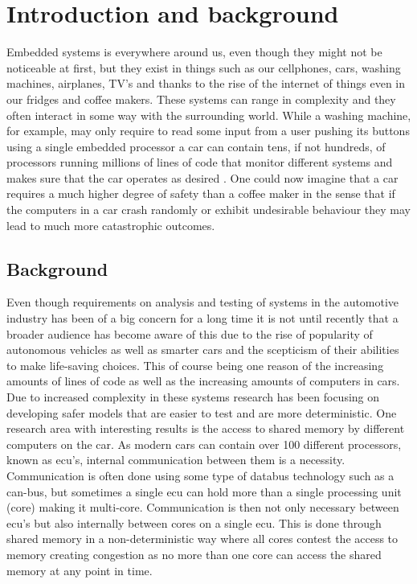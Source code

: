 \documentclass{kththesis}
\begin{document}
\chapter{Introduction and background} 

Embedded systems is everywhere around us, even though they might not be noticeable at first,
but they exist in things such as our cellphones, cars, washing machines, airplanes, TV's and thanks
to the rise of the internet of things even in our fridges and coffee makers. These systems can range
in complexity and they often interact in some way with the surrounding world. While a washing
machine, for example, may only require to read some input from a user pushing its buttons using a
single embedded processor a car can contain tens, if not hundreds, of processors running millions of
lines of code that monitor different systems and makes sure that the car operates as
desired \parencite{doughty-white_million_nodate}. One could now imagine that a car requires a much
higher degree of safety than a coffee maker in the sense that if the computers in a car crash
randomly or exhibit undesirable behaviour they may lead to much more catastrophic outcomes.






\section{Background}

Even though requirements on analysis and testing of systems in the automotive industry has been of a
big concern for a long time it is not until recently that a broader audience has become aware of
this due to the rise of popularity of autonomous vehicles as well as smarter cars and the scepticism
of their abilities to make life-saving choices. This of course being one reason of the increasing
amounts of lines of code as well as the increasing amounts of computers in cars. Due to increased
complexity in these systems research has been focusing on developing safer models that are easier to
test and are more deterministic. One research area with interesting results is the access to shared
memory by different computers on the car. As modern cars can contain over 100 different processors,
known as \acrfull{ecu}'s, internal communication between them is a necessity. Communication is
often done using some type of databus technology such as a \acrfull{can}-bus, but sometimes a single
\acrshort{ecu} can hold more than a single processing unit (core) making it multi-core.
Communication is then not only necessary between \acrshort{ecu}'s but also internally between cores
on a single \acrshort{ecu}. This is done through shared memory in a non-deterministic way where all
cores contest the access to memory creating congestion as no more than one core can access the
shared memory at any point in time. 
\end{document}
